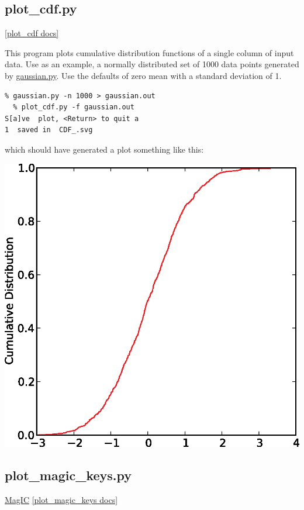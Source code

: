 \documentclass[11pt]{book}
\begin{document}
{{  

  \subsection{plot\_cdf.py}
  \href{https://github.com/PmagPy/PmagPy/blob/master/programs/plot_cdf.py}{[plot\_cdf docs]}

This program plots cumulative distribution functions of a single column of input data.  Use as an example, a normally distributed set of 1000 data points generated by \href{#gaussian.py}{gaussian.py}.  Use the defaults of zero mean with a standard deviation of 1.

\begin{verbatim}
% gaussian.py -n 1000 > gaussian.out
  % plot_cdf.py -f gaussian.out
S[a]ve  plot, <Return> to quit a
1  saved in  CDF_.svg
\end{verbatim}

which should have generated a plot something like this:


\includegraphics[width=12 cm]{EPSfiles/plot_cdf.eps}


%



  \subsection{plot\_magic\_keys.py}
  \href{#MagIC}{MagIC}
  \href{https://github.com/PmagPy/PmagPy/blob/master/programs/plot_magic_keys.py}{[plot\_magic\_keys docs]}

}}
\end{document}
